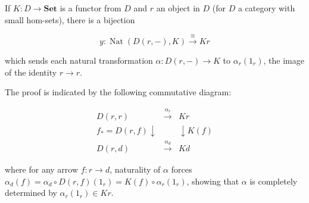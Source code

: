 If $K \colon D \to \mathbf{Set}$ is a functor from $D$ and $r$ an object in $D$ (for $D$ a category with small hom-sets), there is a bijection

$$
y \colon \operatorname{Nat}(D(r, -), K) \xrightarrow{\cong} Kr
$$

which sends each natural transformation $\alpha \colon D(r, -) \to K$ to $\alpha_r(1_r)$, the image of the identity $r \to r$.

The proof is indicated by the following commutative diagram:

$$
\begin{array}{ccc}
D(r, r) & \xrightarrow{\alpha_r} & Kr \\
{\scriptstyle f_* = D(r, f)}\downarrow & & \downarrow {\scriptstyle K(f)} \\
D(r, d) & \xrightarrow{\alpha_d} & Kd
\end{array}
$$

where for any arrow $f \colon r \to d$, naturality of $\alpha$ forces $\alpha_d(f) = \alpha_d \circ D(r, f)(1_r) = K(f) \circ \alpha_r(1_r)$, showing that $\alpha$ is completely determined by $\alpha_r(1_r) \in Kr$.
